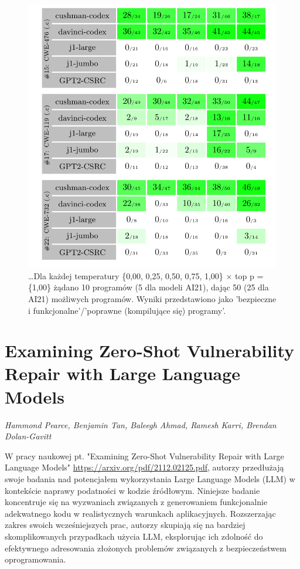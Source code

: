 \begin{figure}[ht]
\begin{minipage}[b]{0.45\textwidth}
        \includegraphics[width=\textwidth]{img/codex-results-2.png}
        \caption{\dots Dla każdej temperatury \{0,00, 0,25, 0,50, 0,75, 1,00\} × top p = \{1,00\} żądano 10 programów (5 dla modeli AI21), dając 50 (25 dla AI21) możliwych programów. Wyniki przedstawiono jako 'bezpieczne i funkcjonalne'/'poprawne (kompilujące się) programy'.}
        \label{fig:second_image}
    \end{minipage}
\end{figure}

\section{Examining Zero-Shot Vulnerability Repair with Large Language Models} \footnotesize\textit{Hammond Pearce, Benjamin Tan, Baleegh Ahmad, Ramesh Karri, Brendan Dolan-Gavitt}

\normalsize
W pracy naukowej pt. "Examining Zero-Shot Vulnerability Repair with Large Language Models"\cite{zero-shot-vuln-repair} \url{https://arxiv.org/pdf/2112.02125.pdf}, autorzy przedłużają swoje badania nad potencjałem wykorzystania Large Language Models (LLM) w kontekście naprawy podatności w kodzie źródłowym. Niniejsze badanie koncentruje się na wyzwaniach związanych z generowaniem funkcjonalnie adekwatnego kodu w realistycznych warunkach aplikacyjnych. Rozszerzając zakres swoich wcześniejszych prac, autorzy skupiają się na bardziej skomplikowanych przypadkach użycia LLM, eksplorując ich zdolność do efektywnego adresowania złożonych problemów związanych z bezpieczeństwem oprogramowania.


